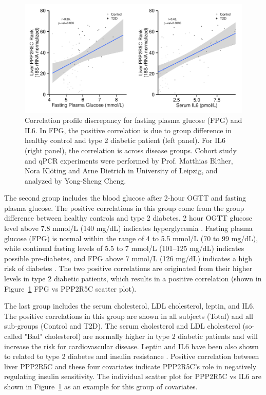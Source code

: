 \begin{figure}[htbp]
\centering
\includegraphics[width=1\textwidth]{figs/fig2-63 human ppp2r5c vs fpg IL6.pdf}
\caption[Correlation profile for FPG and IL6]{\footnotesize Correlation profile discrepancy for fasting plasma glucose (FPG) and IL6. In FPG, the positive correlation is due to group difference in healthy control and type 2 diabetic patient (left panel). For IL6 (right panel), the correlation is across disease groups. Cohort study and qPCR experiments were performed by Prof. Matthias Bl\"uher, Nora Kl\"oting and Arne Dietrich in University of Leipzig, and analyzed by Yong-Sheng Cheng.}
\label{fig:fig2.63}
\end{figure}

The second group includes the blood glucose after 2-hour OGTT and fasting plasma glucose. The positive correlations in this group come from the group difference between healthy controls and type 2 diabetes. 2 hour OGTT glucose level above 7.8 mmol/L (140 mg/dL) indicates hyperglycemia \cite{who/idf_consultation_definition_2006}. Fasting plasma glucose (FPG) is normal within the range of 4 to 5.5 mmol/L (70 to 99 mg/dL), while continual fasting levels of 5.5 to 7 mmol/L (101--125 mg/dL) indicates possible pre-diabetes, and FPG above 7 mmol/L (126 mg/dL) indicates  a high risk of diabetes \cite{who/idf_consultation_definition_2006}. The two positive correlations are originated from their higher levels in type 2 diabetic patients, which results in a positive correlation (shown in Figure~\ref{fig:fig2.63} FPG vs PPP2R5C scatter plot).




The last group includes the serum cholesterol, LDL cholesterol, leptin, and IL6. The positive correlations in this group are shown in all subjects (Total) and all sub-groups (Control and T2D). The serum cholesterol and LDL cholesterol (so-called "Bad" cholesterol) are normally higher in type 2 diabetic patients and will increase the risk for cardiovascular disease. Leptin and IL6 have been also shown to related to type 2 diabetes and insulin resistance \cite{fischer_insulin-resistant_2002,kristiansen_interleukin-6_2005}. Positive correlation between liver PPP2R5C and these four covariates indicate PPP2R5C's role in negatively regulating insulin sensitivity. The individual scatter plot for PPP2R5C vs IL6 are shown in Figure~\ref{fig:fig2.63} as an example for this group of covariates.



